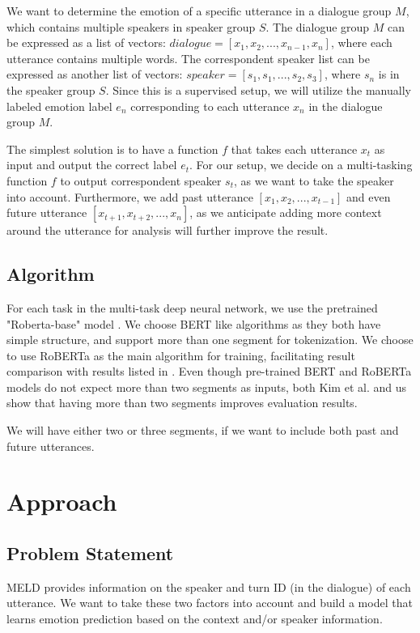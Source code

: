 \documentclass[11pt]{article}
\begin{document}
We want to determine the emotion of a specific utterance in a dialogue group $M$, which contains multiple speakers in speaker group $S$. The dialogue group $M$ can be expressed as a list of vectors: $dialogue = [x_1, x_2, ..., x_{n-1}, x_n]$, where each utterance contains multiple words. The correspondent speaker list can be expressed as another list of vectors: $speaker = [s_1, s_1, ..., s_2, s_3]$, where $s_n$ is in the speaker group $S$. Since this is a supervised setup, we will utilize the manually labeled emotion label $e_n$ corresponding to each utterance $x_n$ in the dialogue group $M$.

The simplest solution is to have a function $f$ that takes each utterance $x_t$ as input and output the correct label $e_t$. For our setup, we decide on a multi-tasking function $f$ to output correspondent speaker $s_t$, as we want to take the speaker into account. Furthermore, we add past utterance $[x_1, x_2, ..., x_{t-1}]$ and even future utterance $[x_{t+1}, x_{t+2}, ..., x_n]$, as we anticipate adding more context around the utterance for analysis will further improve the result.


\subsection{Algorithm}

For each task in the multi-task deep neural network, we use the pretrained "Roberta-base" model \citet{liu-etal-2019-multi}. We choose BERT like algorithms as they both have simple structure, and support more than one segment for tokenization. We choose to use RoBERTa as the main algorithm for training, facilitating result comparison with results listed in \citet{kim-2021-emoberta}. Even though pre-trained BERT and RoBERTa models do not expect more than two segments as inputs, both Kim et al. and us show that having more than two segments improves evaluation results.

We will have either two or three segments, if we want to include both past and future utterances.


\section{Approach}
\label{sec:approach}

\subsection{Problem Statement}
MELD provides information on the speaker and turn ID (in the dialogue) of each utterance. We want to take these two factors into account and build a model that learns emotion prediction based on the context and/or speaker information.
\end{document}

